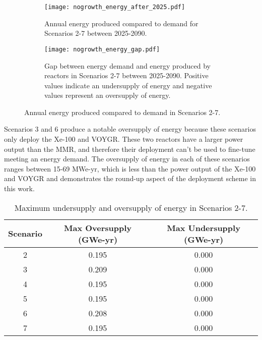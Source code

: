 \begin{figure}
    \centering
    \begin{subfigure}{0.45\textwidth}
        \centering
        \texttt{[image: nogrowth\_energy\_after\_2025.pdf]}
        \caption{Annual energy produced compared to demand for Scenarios 2-7
        between 2025-2090.}
        \label{fig:nogrowth_energy_after_2025}
    \end{subfigure}
    \hfill
    \begin{subfigure}{0.45\textwidth}
        \centering
        \texttt{[image: nogrowth\_energy\_gap.pdf]}
        \caption{Gap between energy demand and energy produced by reactors 
        in Scenarios 2-7 between 2025-2090. Positive values indicate an 
        undersupply of energy and negative values represent an 
        oversupply of energy.}
        \label{fig:nogrowth_energy_gap}
    \end{subfigure}
       \caption{Annual energy produced compared to demand in Scenarios 2-7.}
       \label{fig:nogrowth_energy}
\end{figure}

Scenarios 3 and 6 produce a notable 
oversupply of energy because these scenarios only deploy the Xe-100 and VOYGR.
These two reactors have a larger power output than the \gls{MMR}, and therefore 
their deployment can't be used to fine-tune meeting an energy demand. The oversupply 
of energy in each of these scenarios ranges between 15-69 MWe-yr, which is less 
than the power output of the Xe-100 and VOYGR and demonstrates the round-up 
aspect of the deployment scheme in this work. 

\begin{table}
    \centering
    \caption{Maximum undersupply and oversupply of energy in Scenarios 2-7.}
    \label{tab:nogrowth_energy}
    \begin{tabular}{c c c}
        \hline 
        Scenario & Max Oversupply (GWe-yr) & Max Undersupply (GWe-yr) \\
        \hline 
        2 & 0.195 & 0.000 \\
        3 & 0.209 & 0.000 \\
        4 & 0.195 & 0.000 \\
        5 & 0.195 & 0.000 \\
        6 & 0.208 & 0.000 \\
        7 & 0.195 & 0.000 \\
        \hline
        
    \end{tabular}
\end{table}

